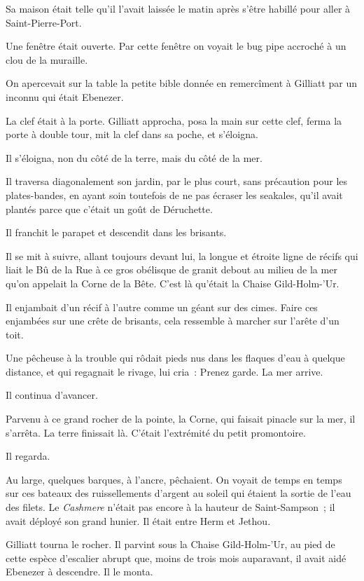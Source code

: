 \documentclass[french,twoside]{book} %
\begin{document}
Sa maison était telle qu’il l’avait laissée le matin après s’être habillé pour aller à Saint-Pierre-Port.\par
Une fenêtre était ouverte. Par cette fenêtre on  voyait le bug pipe accroché à un clou de la muraille.\par
On apercevait sur la table la petite bible donnée en remercîment à Gilliatt par un inconnu qui était Ebenezer.\par
La clef était à la porte. Gilliatt approcha, posa la main sur cette clef, ferma la porte à double tour, mit la clef dans sa poche, et s’éloigna.\par
Il s’éloigna, non du côté de la terre, mais du côté de la mer.\par
Il traversa diagonalement son jardin, par le plus court, sans précaution pour les plates-bandes, en ayant soin toutefois de ne pas écraser les seakales, qu’il avait plantés parce que c’était un goût de Déruchette.\par
Il franchit le parapet et descendit dans les brisants.\par
Il se mit à suivre, allant toujours devant lui, la longue et étroite ligne de récifs qui liait le Bû de la Rue à ce gros obélisque de granit debout au milieu de la mer qu’on appelait la Corne de la Bête. C’est là qu’était la Chaise Gild-Holm-’Ur.\par
Il enjambait d’un récif à l’autre comme un géant sur des cimes. Faire ces enjambées sur une crête de brisants, cela ressemble à marcher sur l’arête d’un toit.\par
Une pêcheuse à la trouble qui rôdait pieds nus dans les flaques d’eau à quelque distance, et qui regagnait le rivage, lui cria : Prenez garde. La mer arrive.\par
Il continua d’avancer.\par
Parvenu à ce grand rocher de la pointe, la Corne,  qui faisait pinacle sur la mer, il s’arrêta. La terre finissait là. C’était l’extrémité du petit promontoire.\par
Il regarda.\par
Au large, quelques barques, à l’ancre, pêchaient. On voyait de temps en temps sur ces bateaux des ruissellements d’argent au soleil qui étaient la sortie de l’eau des filets. Le \emph{Cashmere} n’était pas encore à la hauteur de Saint-Sampson ; il avait déployé son grand hunier. Il était entre Herm et Jethou.\par
Gilliatt tourna le rocher. Il parvint sous la Chaise Gild-Holm-’Ur, au pied de cette espèce d’escalier abrupt que, moins de trois mois auparavant, il avait aidé Ebenezer à descendre. Il le monta.\par
\end{document}
